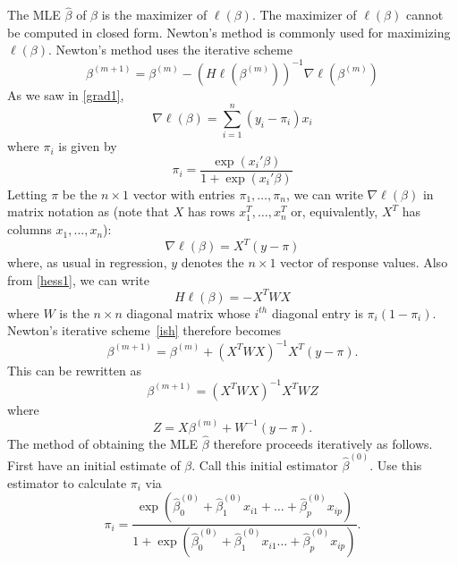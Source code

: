 \documentclass{scrartcl}
\begin{document}
The MLE $\hat{\beta}$ of $\beta$ is the maximizer of $\ell(\beta)$. The maximizer of
$\ell(\beta)$ cannot be computed in closed form. Newton's
method is commonly used for maximizing $\ell(\beta)$. Newton's method
uses the iterative scheme
\begin{equation}\label{ish}
  \beta^{(m+1)} = \beta^{(m)} - \left(H\ell(\beta^{(m)})\right)^{-1}
  \nabla \ell(\beta^{(m)}) 
\end{equation}
As we saw in \eqref{grad1},
\begin{equation*}
  \nabla \ell(\beta) = \sum_{i=1}^n \left(y_i - \pi_i \right) x_i
\end{equation*}
where $\pi_i$ is given by
\begin{equation*}
  \pi_i = \frac{\exp(x_i' \beta)}{1 + \exp(x_i' \beta)}
\end{equation*}
Letting $\pi$ be the $n \times 1$ vector with entries $\pi_1, \dots,
\pi_n$, we can write $\nabla \ell(\beta)$ in matrix notation as (note
that $X$ has rows $x_1^T, \dots, x_n^T$ or, equivalently, $X^T$ has
columns $x_1, \dots, x_n$):
\begin{equation*}
\nabla  \ell(\beta) = X^T \left(y - \pi \right)
\end{equation*}
where, as usual in regression, $y$ denotes the $n \times 1$  vector of
response values. Also from \eqref{hess1}, we can write
\begin{equation*}
  H\ell(\beta) = - X^T W X
\end{equation*}
where $W$ is the $n \times n$ diagonal matrix whose $i^{th}$ diagonal
entry is $\pi_i(1 - \pi_i)$. Newton's iterative scheme~\eqref{ish}
therefore becomes 
\begin{equation*}
  \beta^{(m+1)} = \beta^{(m)} + (X^T W X)^{-1} X^T (y - \pi). 
\end{equation*}
This can be rewritten as 
\begin{equation}\label{wlse}
  \beta^{(m+1)} = (X^T W X)^{-1} X^T W Z
\end{equation}
where 
\begin{equation}\label{zdef}
  Z = X \beta^{(m)} + W^{-1}(y - \pi). 
\end{equation}
The method of obtaining the MLE $\hat{\beta}$ therefore proceeds iteratively as
follows. First have an initial estimate of $\beta$. Call this initial
estimator $\hat{\beta}^{(0)}$. Use this 
estimator to calculate $\pi_i$ via 
\begin{equation*}
\pi_i = \frac{\exp(\hat{\beta}^{(0)}_0 + \hat{\beta}^{(0)}_1 x_{i1} + \dots +
  \hat{\beta}^{(0)}_p x_{ip})}{1 + \exp(\hat{\beta}^{(0)}_0 +
  \hat{\beta}^{(0)}_1 x_{i1} \dots + \hat{\beta}^{(0)}_p x_{ip})}.        
\end{equation*}
\end{document}
